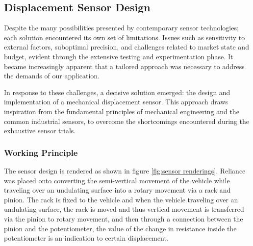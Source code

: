 \subsection{Displacement Sensor Design}

Despite the many possibilities presented by contemporary sensor technologies; each solution encountered its own set of limitations. Issues such as sensitivity to external factors, suboptimal precision, and challenges related to market state and budget, evident through the extensive testing and experimentation phase. It became increasingly apparent that a tailored approach was necessary to address the demands of our application.

In response to these challenges, a decisive solution emerged: the design and implementation of a mechanical displacement sensor. This approach draws inspiration from the fundamental principles of mechanical engineering and the common industrial sensors, to overcome the shortcomings encountered during the exhaustive sensor trials.

\subsubsection{Working Principle}
The sensor design is rendered as shown in figure \ref{fig:sensor renderings}.
Reliance was placed onto converting the semi-vertical movement of the vehicle while traveling over an undulating surface into a rotary movement via a rack and pinion. The rack is fixed to the vehicle and when the vehicle traveling over an undulating surface, the rack is moved and thus vertical movement is transferred via the pinion to rotary movement, and then through a connection between the pinion and the potentiometer, the value of the change in resistance inside the potentiometer is an indication to certain displacement.


